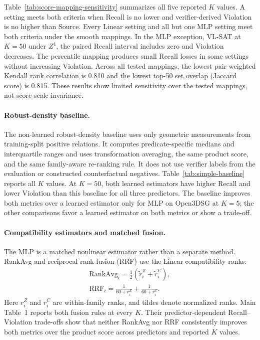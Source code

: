 \clearpage
\twocolumn

Table~\ref{tab:score-mapping-sensitivity} summarizes all five reported $K$ values. A setting meets both criteria when Recall is no lower and verifier-derived Violation is no higher than Source. Every Linear setting and all but one MLP setting meet both criteria under the smooth mappings. In the MLP exception, VL-SAT at $K=50$ under $Z^4$, the paired Recall interval includes zero and Violation decreases. The percentile mapping produces small Recall losses in some settings without increasing Violation. Across all tested mappings, the lowest pair-weighted Kendall rank correlation is 0.810 and the lowest top-50 set overlap (Jaccard score) is 0.815. These results show limited sensitivity over the tested mappings, not score-scale invariance.

\paragraph{Robust-density baseline.}
The non-learned robust-density baseline uses only geometric measurements from training-split positive relations. It computes predicate-specific medians and interquartile ranges and uses transformation averaging, the same product score, and the same family-aware re-ranking rule. It does not use verifier labels from the evaluation or constructed counterfactual negatives.
Table~\ref{tab:simple-baseline} reports all $K$ values. At $K=50$, both learned estimators have higher Recall and lower Violation than this baseline for all three predictors. The baseline improves both metrics over a learned estimator only for MLP on Open3DSG at $K=5$; the other comparisons favor a learned estimator on both metrics or show a trade-off.

\paragraph{Compatibility estimators and matched fusion.}
The MLP is a matched nonlinear estimator rather than a separate method. RankAvg and reciprocal rank fusion (RRF) use the Linear compatibility ranks:
\begin{equation}
\begin{aligned}
\mathrm{RankAvg}_i=\tfrac{1}{2}
\left(\widetilde r_i^Z+\widetilde r_i^C\right),\\
\mathrm{RRF}_i=
\frac{1}{60+r_i^Z}+\frac{1}{60+r_i^C}.
\end{aligned}
\end{equation}
Here $r_i^Z$ and $r_i^C$ are within-family ranks, and tildes denote normalized ranks. Main Table~1 reports both fusion rules at every $K$. Their predictor-dependent Recall--Violation trade-offs show that neither RankAvg nor RRF consistently improves both metrics over the product score across predictors and reported $K$ values.


